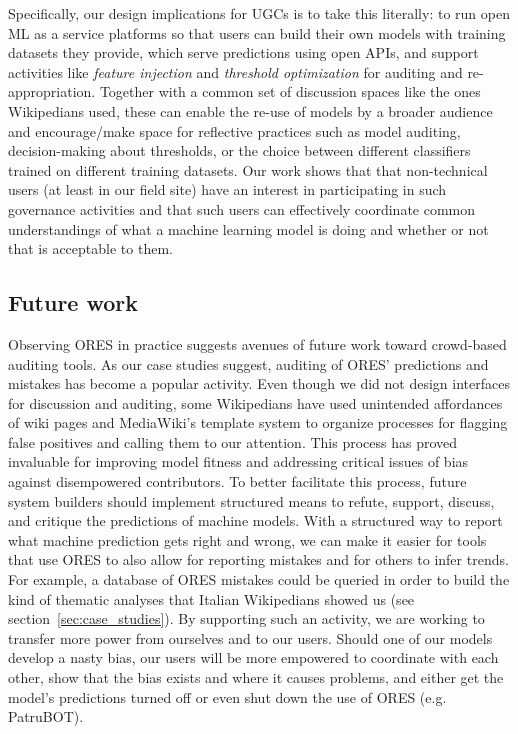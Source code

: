 Specifically, our design implications for UGCs is to take this literally: to run open ML as a service platforms so that users can build their own models with training datasets they provide, which serve predictions using open APIs, and support activities like \emph{feature injection} and \emph{threshold optimization} for auditing and re-appropriation. Together with a common set of discussion spaces like the ones Wikipedians used, these can enable the re-use of models by a broader audience and encourage/make space for reflective practices such as model auditing, decision-making about thresholds, or the choice between different classifiers trained on different training datasets.  Our work shows that that non-technical users (at least in our field site) have an interest in participating in such governance activities and that such users can effectively coordinate common understandings of what a machine learning model is doing and whether or not that is acceptable to them.

\subsection{Future work}
Observing ORES in practice suggests avenues of future work toward crowd-based auditing tools.  As our case studies suggest, auditing of ORES' predictions and mistakes has become a popular activity.  Even though we did not design interfaces for discussion and auditing, some Wikipedians have used unintended affordances of wiki pages and MediaWiki's template system to organize processes for flagging false positives and calling them to our attention.  This process has proved invaluable for improving model fitness and addressing critical issues of bias against disempowered contributors.  To better facilitate this process, future system builders should implement structured means to refute, support, discuss, and critique the predictions of machine models.  With a structured way to report what machine prediction gets right and wrong, we can make it easier for tools that use ORES to also allow for reporting mistakes and for others to infer trends.  For example, a database of ORES mistakes could be queried in order to build the kind of thematic analyses that Italian Wikipedians showed us (see section~\ref{sec:case_studies}).  By supporting such an activity, we are working to transfer more power from ourselves and to our users.  Should one of our models develop a nasty bias, our users will be more empowered to coordinate with each other, show that the bias exists and where it causes problems, and either get the model's predictions turned off or even shut down the use of ORES (e.g. PatruBOT).

